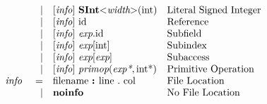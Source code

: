 \documentclass[12pt]{article}
\begin{document}
{\[\begin{array}{rrll}
                &\vert &[\text{\em info}]\  \text{\bf SInt} \text{\bf $<$} \text{\em width} \text{\bf $>$}(\text{int})                       &\text{Literal Signed Integer}\\
                &\vert &[\text{\em info}]\  \text{id }                                                                     &\text{Reference}\\
                &\vert &[\text{\em info}]\  \text{\em exp}.\text{id }                                                           &\text{Subfield}\\
                &\vert &[\text{\em info}]\  \text{\em exp}[\text{int}]                                                        &\text{Subindex}\\
                &\vert &[\text{\em info}]\  \text{\em exp}[\text{\em exp}]                                                    &\text{Subaccess}\\
                &\vert &[\text{\em info}]\  \text{\em primop}(\text{\em exp*}, \text{int}\text{*})                                 &\text{Primitive Operation}\\
\text{\em info\ }       &=     &\text{filename } \text{\bf :\ } \text{line } . \text{ col}                            &\text{File Location}\\
                &\vert &\text{\bf noinfo\ }                                                                   &\text{No File Location}\\
\end{array}
\]
}
\end{document}
